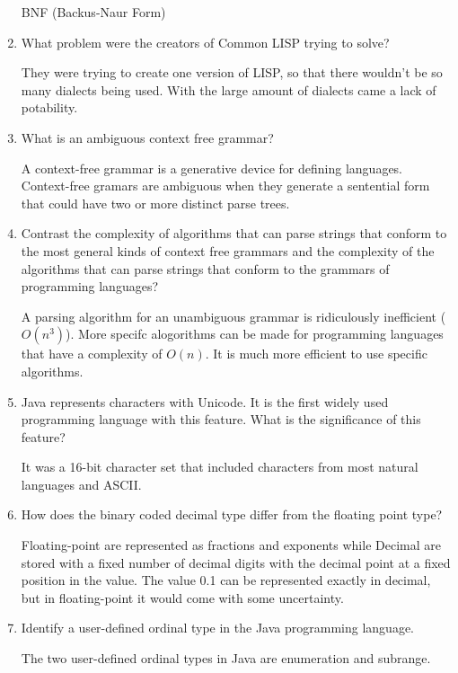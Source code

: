 \begin{enumerate}
\begin{answer}
BNF (Backus-Naur Form)
\end{answer}
\item What problem were the creators of Common LISP trying to solve?
\begin{answer}
They were trying to create one version of LISP, so that there
wouldn't be so many dialects being used. With the large amount of
dialects came a lack of potability.
\end{answer}
\item What is an ambiguous context free grammar?
\begin{answer}
A context-free grammar is a generative device for defining
languages. Context-free gramars are ambiguous when they generate a
sentential form that could have two or more distinct parse trees.
\end{answer}
\item Contrast the complexity of algorithms that can parse strings
that conform to the most general kinds of context free grammars
and the complexity of the algorithms that can parse strings that
conform to the grammars of programming languages?
\begin{answer}
A parsing algorithm for an unambiguous grammar is ridiculously
inefficient ($O(n^3)$). More specifc alogorithms can be made for
programming languages that have a complexity of $O(n)$. It is much
more efficient to use specific algorithms.
\end{answer}
\item Java represents characters with Unicode. It is the first
widely used programming language with this feature. What is the
significance of this feature?
\begin{answer}
It was a 16-bit character set that included characters from most
natural languages and ASCII.
\end{answer}
\item How does the binary coded decimal type differ from the
floating point type?
\begin{answer}
Floating-point are represented as fractions and exponents while
Decimal are stored with a fixed number of decimal digits with the
decimal point at a fixed position in the value. The value 0.1 can
be represented exactly in decimal, but in floating-point it would
come with some uncertainty.
\end{answer}
\item Identify a user-defined ordinal type in the Java programming
language.
\begin{answer}
The two user-defined ordinal types in Java are enumeration and subrange.

\end{answer}
\end{enumerate}
